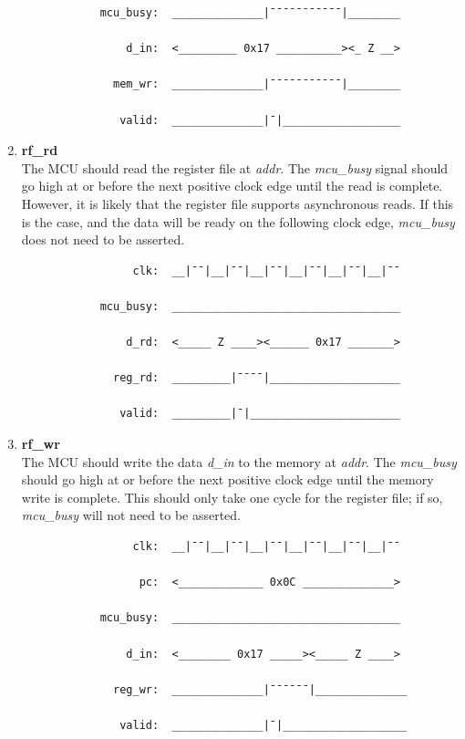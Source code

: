 \documentclass[10pt,a4paper]{article}
\begin{document}
\begin{enumerate}
\begin{verbatim}
            mcu_busy:  ______________|¯¯¯¯¯¯¯¯¯¯¯|________

                d_in:  <_________ 0x17 __________><_ Z __>

              mem_wr:  ______________|¯¯¯¯¯¯¯¯¯¯¯|________

               valid:  ______________|¯|__________________
        \end{verbatim}

    \item\textbf{rf\_rd}\\
    The MCU should read the register file at \emph{addr}. The \emph{mcu\_busy} signal should go
    high at or before the next positive clock edge until the read is complete. However, it is
    likely that the register file supports asynchronous reads. If this is the case, and the data
    will be ready on the following clock edge, \emph{mcu\_busy} does not need to be asserted.

        \begin{verbatim}
                 clk:  __|¯¯|__|¯¯|__|¯¯|__|¯¯|__|¯¯|__|¯¯

            mcu_busy:  ___________________________________

                d_rd:  <_____ Z ____><______ 0x17 _______>

              reg_rd:  _________|¯¯¯¯|____________________

               valid:  _________|¯|_______________________
        \end{verbatim}

    \item\textbf{rf\_wr}\\
    The MCU should write the data \emph{d\_in} to the memory at \emph{addr}. The \emph{mcu\_busy} 
    should go high at or before the next positive clock edge until the memory write is complete.
    This should only take one cycle for the register file; if so, \emph{mcu\_busy} will not need to
    be asserted.

        \begin{verbatim}
                 clk:  __|¯¯|__|¯¯|__|¯¯|__|¯¯|__|¯¯|__|¯¯

                  pc:  <_____________ 0x0C ______________>

            mcu_busy:  ___________________________________

                d_in:  <________ 0x17 _____><_____ Z ____> 

              reg_wr:  ______________|¯¯¯¯¯¯|______________

               valid:  ______________|¯|___________________
        \end{verbatim}

\end{enumerate}
\end{document}
